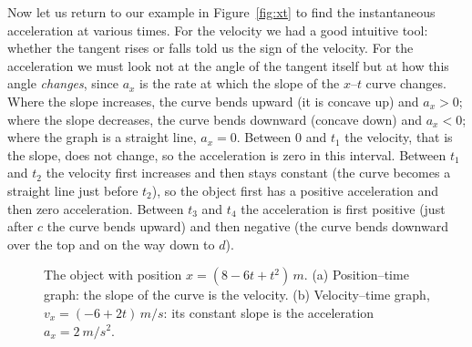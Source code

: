 \documentclass[11pt,a4paper]{article}
\begin{document}
Now let us return to our example in Figure~\ref{fig:xt} to find the instantaneous acceleration at
various times. For the velocity we had a good intuitive tool: whether the tangent rises or falls
told us the sign of the velocity. For the acceleration we must look not at the angle of the
tangent itself but at how this angle \emph{changes}, since $a_x$ is the rate at which the slope of
the $x$--$t$ curve changes. Where the slope increases, the curve bends upward (it is concave up)
and $a_x > 0$; where the slope decreases, the curve bends downward (concave down) and $a_x < 0$;
where the graph is a straight line, $a_x = 0$. Between $0$ and $t_1$ the velocity, that is the
slope, does not change, so the acceleration is zero in this interval. Between $t_1$ and $t_2$ the
velocity first increases and then stays constant (the curve becomes a straight line just before
$t_2$), so the object first has a positive acceleration and then zero acceleration. Between $t_3$
and $t_4$ the acceleration is first positive (just after $c$ the curve bends upward) and then
negative (the curve bends downward over the top and on the way down to $d$).

\begin{figure}[ht]
\centering
{}
\caption{The object with position $x = (8 - 6t + t^2)\,\unit{m}$. (a) Position--time graph: the slope of
the curve is the velocity. (b) Velocity--time graph, $v_x = (-6 + 2t)\,\unit{m/s}$: its constant slope
is the acceleration $a_x = \qty{2}{m/s^2}$.}\label{fig:parabola}
\end{figure}
\end{document}
